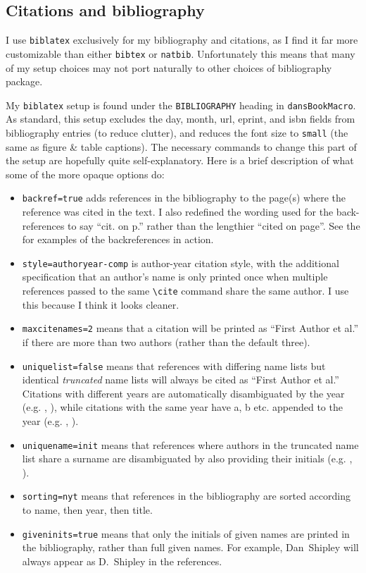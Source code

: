 \subsection{Citations and bibliography}
I use \verb!biblatex! exclusively for my bibliography and citations, as I find it far more customizable than either \verb!bibtex! or \verb!natbib!.
Unfortunately this means that many of my setup choices may not port naturally to other choices of bibliography package.

My \verb!biblatex! setup is found under the \texttt{BIBLIOGRAPHY} heading in \texttt{dansBookMacro}.
As standard, this setup excludes the day, month, url, eprint, and isbn fields from bibliography entries (to reduce clutter), and reduces the font size to \verb!small! (the same as figure \& table captions).
The necessary commands to change this part of the setup are hopefully quite self-explanatory.
Here is a brief description of what some of the more opaque options do:
\begin{itemize}
    \item \verb!backref=true! adds references in the bibliography to the page(s) where the reference was cited in the text.
    I also redefined the wording used for the back-references to say ``cit. on p.'' rather than the lengthier ``cited on page''.
    See the  for examples of the backreferences in action.
    \item \verb!style=authoryear-comp! is author-year citation style, with the additional specification that an author's name is only printed once when multiple references passed to the same \verb!\cite! command share the same author.
    I use this because I think it looks cleaner.
    \item \verb!maxcitenames=2! means that a citation will be printed as ``First Author et al.'' if there are more than two authors (rather than the default three).
    \item \verb!uniquelist=false! means that references with differing name lists but identical \textit{truncated} name lists will always be cited as ``First Author et al.''
    Citations with different years are automatically disambiguated by the year (e.g. \cite{ar:SiebesmaEtAl2003}, \cite{ar:SiebesmaEtAl2007}), while citations with the same year have a, b etc. appended to the year (e.g. \cite{ar:GuEtAl2020_JAS}, \cite{ar:GuEtAl2020_GRL}).
    \item \verb!uniquename=init! means that references where authors in the truncated name list share a surname are disambiguated by also providing their initials (e.g. \cite{ar:Malkus1954a}, \cite{ar:RiehlMalkus1958}).
    \item \verb!sorting=nyt! means that references in the bibliography are sorted according to name, then year, then title.
    \item \verb!giveninits=true! means that only the initials of given names are printed in the bibliography, rather than full given names.
    For example, Dan~Shipley will always appear as D.~Shipley in the references.
\end{itemize}

